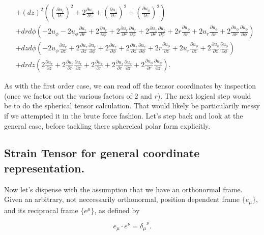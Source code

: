 \begin{equation}
\begin{aligned}
&+(dz)^2 \left(\left(\frac{\partial u_r}{\partial z}\right)^2+2 \frac{\partial u_z}{\partial z}+\left(\frac{\partial u_z}{\partial z}\right)^2+\left(\frac{\partial u_{\phi }}{\partial z}\right)^2\right) \\
&+dr d\phi  \left(-2 u_{\phi }-2 u_{\phi } \frac{\partial u_r}{\partial r}+2 \frac{\partial u_r}{\partial \phi }+2 \frac{\partial u_r}{\partial r} \frac{\partial u_r}{\partial \phi }+2 \frac{\partial u_z}{\partial r} \frac{\partial u_z}{\partial \phi }+2 r \frac{\partial u_{\phi }}{\partial r}+2 u_r \frac{\partial u_{\phi }}{\partial r}+2 \frac{\partial u_{\phi }}{\partial r} \frac{\partial u_{\phi }}{\partial \phi }\right) \\
&+dz d\phi  \left(-2 u_{\phi } \frac{\partial u_r}{\partial z}+2 \frac{\partial u_r}{\partial z} \frac{\partial u_r}{\partial \phi }+2 \frac{\partial u_z}{\partial \phi }+2 \frac{\partial u_z}{\partial z} \frac{\partial u_z}{\partial \phi }+2 r \frac{\partial u_{\phi }}{\partial z}+2 u_r \frac{\partial u_{\phi }}{\partial z}+2 \frac{\partial u_{\phi }}{\partial z} \frac{\partial u_{\phi }}{\partial \phi }\right) \\
&+dr dz \left(2 \frac{\partial u_r}{\partial z}+2 \frac{\partial u_r}{\partial r} \frac{\partial u_r}{\partial z}+2 \frac{\partial u_z}{\partial r}+2 \frac{\partial u_z}{\partial r} \frac{\partial u_z}{\partial z}+2 \frac{\partial u_{\phi }}{\partial r} \frac{\partial u_{\phi }}{\partial z}\right).
\end{aligned}
\end{equation}

As with the first order case, we can read off the tensor coordinates by inspection (once we factor out the various factors of $2$ and $r$).  The next logical step would be to do the spherical tensor calculation.  That would likely be particularily messy if we attempted it in the brute force fashion.  Let's step back and look at the general case, before tackling there sphereical polar form explicitly.

\subsection{Strain Tensor for general coordinate representation.}

Now let's dispense with the assumption that we have an orthonormal frame.  Given an arbitrary, not neccessarily orthonormal, position dependent frame $\{e_\mu\}$, and its reciprocal frame $\{e^\mu\}$, as defined by

\begin{equation}\label{eqn:continuumL2:510}
e_\mu \cdot e^\nu = {\delta_\mu}^\nu.
\end{equation}

